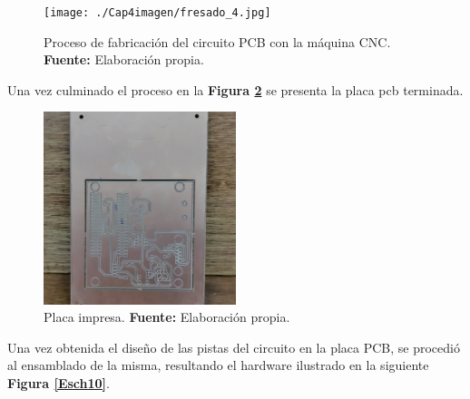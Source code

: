 \begin{figure}[H]
	\centering
		\texttt{[image: ./Cap4imagen/fresado\_4.jpg]}
	\caption[Proceso de fabricación del circuito PCB con la máquina CNC.]{Proceso de fabricación del circuito PCB con la máquina CNC.\textbf{ Fuente:} Elaboración propia.}
	\label{Esch8} %
\end{figure}






Una vez culminado el proceso en la \textbf{Figura \ref{Esch9}} se presenta la placa pcb terminada. 


\begin{figure}[H]
	\centering
	\includegraphics[width=0.5\textwidth]{./Cap4imagen/placa_pcb_4.jpg}
	\caption[Placa impresa.]{Placa impresa. \textbf{ Fuente:} Elaboración propia.}
	\label{Esch9} %
\end{figure}


Una vez obtenida el diseño de las pistas del circuito en la placa PCB, se procedió al ensamblado de la misma, resultando el hardware ilustrado en la siguiente \textbf{Figura \ref{Esch10}}.


 
